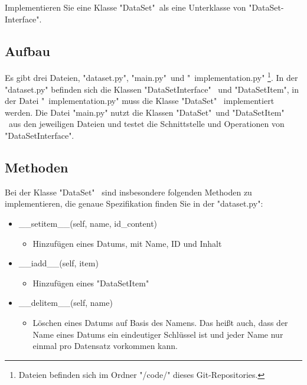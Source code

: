 \documentclass{article}
\begin{document}
Implementieren Sie eine Klasse "DataSet"\ als eine Unterklasse von "DataSet-
Interface".		
\renewcommand\thefootnote{*}
\subsection{Aufbau}	
Es gibt drei Dateien, "dataset.py", "main.py"\ und "\ implementation.py" \footnote{Dateien befinden sich im Ordner "/code/" dieses Git-Repositories.}. In der
"dataset.py" befinden sich die Klassen "DataSetInterface" \ und "DataSetItem",
in der Datei "\ implementation.py" muss die Klasse "DataSet" \ implementiert
werden. Die Datei "main.py" nutzt die Klassen "DataSet"\ und "DataSetItem" \
aus den jeweiligen Dateien und testet die Schnittstelle und Operationen von
"DataSetInterface".	

\subsection{Methoden}
Bei der Klasse "DataSet" \ sind insbesondere folgenden Methoden zu implementieren, die genaue Spezifikation finden Sie in der "dataset.py":

\begin{itemize}
\item \_\_setitem\_\_(self, name, id\_content)
	\begin{itemize}
		\item[]	Hinzufügen eines Datums, mit Name, ID und Inhalt
	\end{itemize}

\end{itemize}

\begin{itemize}
	\item \_\_iadd\_\_(self, item)
	\begin{itemize}
		\item[]	Hinzufügen eines "DataSetItem"
	\end{itemize}
	
\end{itemize}

\begin{itemize}
	\item \_\_delitem\_\_(self, name)
	\begin{itemize}
		\item[]	Löschen eines Datums auf Basis des Namens.
		Das heißt auch, dass der Name eines Datums ein eindeutiger Schlüssel
		ist und jeder Name nur einmal pro Datensatz vorkommen kann.
	\end{itemize}
\end{itemize}
\end{document}
